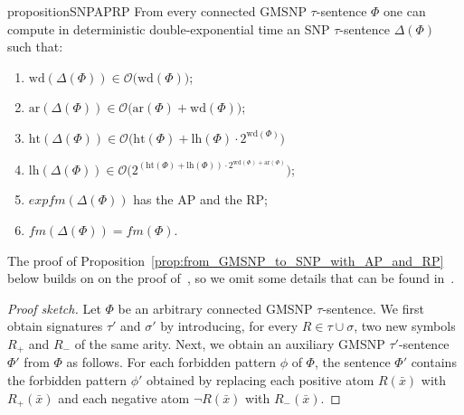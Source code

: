 \documentclass[oneside,reqno,12pt]{amsart}
\theoremstyle{plain}
\theoremstyle{remark}
\newcommand{\fm}{\ensuremath{\mathit{fm}}\xspace}
\newcommand{\efm}{\ensuremath{\mathit{expfm}}\xspace}
\newcommand{\hh}{\ensuremath{\mathrm{ht}}\xspace}
\newcommand{\lh}{\ensuremath{\mathrm{lh}}\xspace}
\newcommand{\wh}{\ensuremath{\mathrm{wd}}\xspace}
\newcommand{\ar}{\ensuremath{\mathrm{ar}}\xspace}
\begin{document}
{ 
 \begin{restatable}{proposition}{SNPAPRP}    \label{prop:from_GMSNP_to_SNP_with_AP_and_RP}  
 From every connected GMSNP $\tau$-sentence $\Phi$ one can compute in deterministic double-exponential time
an SNP $\tau$-sentence $\Delta(\Phi)$ such that:
\begin{enumerate} 
    \item $\wh(\Delta(\Phi)) \in \mathcal{O}\bigl(\wh(\Phi)\bigr)$;
    \item $\ar(\Delta(\Phi)) \in \mathcal{O}\bigl(\ar(\Phi)+\wh(\Phi)\bigr)$;
    \item $\hh(\Delta(\Phi)) \in \mathcal{O}\bigl(\hh(\Phi)+\lh(\Phi)\cdot 2^{\wh(\Phi)}\bigr)$
    \item $\lh(\Delta(\Phi)) \in \mathcal{O}\bigl(2^{(\hh(\Phi)+\lh(\Phi))\cdot 2^{\wh(\Phi)+\ar(\Phi)}}\bigr)$;
    \item \label{item:AP_andRP} $\efm(\Delta(\Phi))$ has the AP and the RP;
    \item $\fm(\Delta(\Phi))=\fm(\Phi)$.
\end{enumerate}

\end{restatable}
 
 The proof of Proposition~\ref{prop:from_GMSNP_to_SNP_with_AP_and_RP} below builds on on the proof of~\cite[Theorem~5]{bodirsky_asnp}, so we omit some details that can be found in~\cite{bodirsky_asnp}.
\begin{proof}[Proof sketch]   
Let $\Phi$ be an arbitrary connected GMSNP $\tau$-sentence.
We first obtain  signatures $\tau'$ and $\sigma'$ by introducing, for every $R\in \tau\cup \sigma$, two new symbols $R_+$ and $R_-$ of the same arity. 
Next, we obtain an auxiliary GMSNP $\tau'$-sentence $\Phi'$ from $\Phi$ as follows.
For each forbidden pattern $\phi$ of $\Phi$, the sentence $\Phi'$ contains the forbidden pattern $\phi'$ obtained by replacing each positive atom $R(\bar{x})$ with $R_+(\bar{x})$ and each negative atom $\neg R(\bar{x})$ with $R_-(\bar{x})$. 


\end{proof}}
\end{document}
